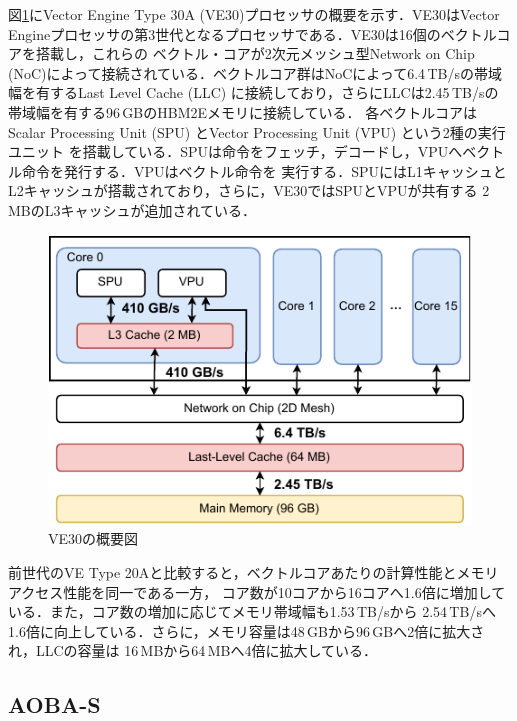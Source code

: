 ﻿\documentclass[submit,techrep,noauthor]{ipsj}
\begin{document}
図\ref{fig:ve30}にVector Engine Type 30A (VE30)プロセッサの概要を示す．VE30はVector
Engineプロセッサの第3世代となるプロセッサである．VE30は16個のベクトルコアを搭載し，これらの
ベクトル・コアが2次元メッシュ型Network on Chip
(NoC)によって接続されている．ベクトルコア群はNoCによって6.4\,TB/sの帯域幅を有するLast Level Cache 
(LLC) に接続しており，さらにLLCは2.45\,TB/sの帯域幅を有する96\,GBのHBM2Eメモリに接続している．
各ベクトルコアはScalar Processing Unit (SPU) とVector Processing Unit (VPU) という2種の実行ユニット
を搭載している．SPUは命令をフェッチ，デコードし，VPUへベクトル命令を発行する．VPUはベクトル命令を
実行する．SPUにはL1キャッシュとL2キャッシュが搭載されており，さらに，VE30ではSPUとVPUが共有する
2\,MBのL3キャッシュが追加されている．

\begin{figure}
  \centering
  \includegraphics{figs/ve30_memory_hierarchy.pdf}
  \caption{VE30の概要図~\cite{Takahashi2023}}\label{fig:ve30}
\end{figure}

前世代のVE Type 20Aと比較すると，ベクトルコアあたりの計算性能とメモリアクセス性能を同一である一方，
コア数が10コアから16コアへ1.6倍に増加している．また，コア数の増加に応じてメモリ帯域幅も1.53\,TB/sから
2.54\,TB/sへ1.6倍に向上している．さらに，メモリ容量は48\,GBから96\,GBへ2倍に拡大され，LLCの容量は
16\,MBから64\,MBへ4倍に拡大している．

\subsection{AOBA-S}
\end{document}
